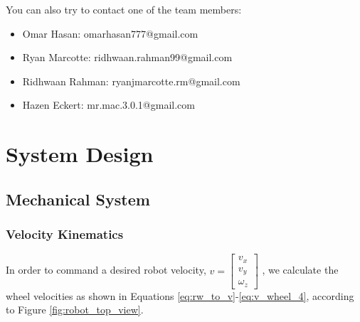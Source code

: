 \documentclass[letterpaper,12pt]{article}
\begin{document}
You can also try to contact one of the team members:
\begin{itemize}
    \item Omar Hasan:           omarhasan777@gmail.com
    \item Ryan Marcotte:        ridhwaan.rahman99@gmail.com
    \item Ridhwaan Rahman:      ryanjmarcotte.rm@gmail.com
    \item Hazen Eckert:         mr.mac.3.0.1@gmail.com
\end{itemize}

\pagebreak
\tableofcontents
\pagebreak

\section{System Design}

\subsection{Mechanical System}
\subsubsection{Velocity Kinematics}
\label{sec:ar9331_vel_kin}

In order to command a desired robot velocity,
\begin{math}
  v=
  \begin{bmatrix}
    v_x \\
    v_y \\
    \omega_z
  \end{bmatrix}
\end{math}
, we calculate the wheel velocities as shown in Equations \ref{eq:rw_to_v}-\ref{eq:v_wheel_4}, according to Figure \ref{fig:robot_top_view}.
\end{document}
